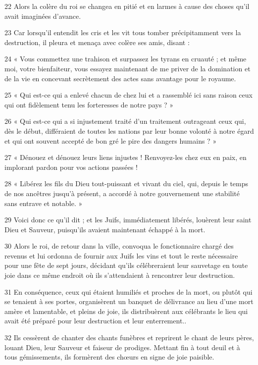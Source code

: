 \par 22 Alors la colère du roi se changea en pitié et en larmes à cause des choses qu'il avait imaginées d'avance.
\par 23 Car lorsqu'il entendit les cris et les vit tous tomber précipitamment vers la destruction, il pleura et menaça avec colère ses amis, disant :
\par 24 « Vous commettez une trahison et surpassez les tyrans en cruauté ; et même moi, votre bienfaiteur, vous essayez maintenant de me priver de la domination et de la vie en concevant secrètement des actes sans avantage pour le royaume.
\par 25 « Qui est-ce qui a enlevé chacun de chez lui et a rassemblé ici sans raison ceux qui ont fidèlement tenu les forteresses de notre pays ? »
\par 26 « Qui est-ce qui a si injustement traité d'un traitement outrageant ceux qui, dès le début, différaient de toutes les nations par leur bonne volonté à notre égard et qui ont souvent accepté de bon gré le pire des dangers humains ? »
\par 27 « Dénouez et dénouez leurs liens injustes ! Renvoyez-les chez eux en paix, en implorant pardon pour vos actions passées !
\par 28 « Libérez les fils du Dieu tout-puissant et vivant du ciel, qui, depuis le temps de nos ancêtres jusqu'à présent, a accordé à notre gouvernement une stabilité sans entrave et notable. »
\par 29 Voici donc ce qu'il dit ; et les Juifs, immédiatement libérés, louèrent leur saint Dieu et Sauveur, puisqu'ils avaient maintenant échappé à la mort.
\par 30 Alors le roi, de retour dans la ville, convoqua le fonctionnaire chargé des revenus et lui ordonna de fournir aux Juifs les vins et tout le reste nécessaire pour une fête de sept jours, décidant qu'ils célébreraient leur sauvetage en toute joie dans ce même endroit où ils s'attendaient à rencontrer leur destruction.
\par 31 En conséquence, ceux qui étaient humiliés et proches de la mort, ou plutôt qui se tenaient à ses portes, organisèrent un banquet de délivrance au lieu d'une mort amère et lamentable, et pleins de joie, ils distribuèrent aux célébrants le lieu qui avait été préparé pour leur destruction et leur enterrement..
\par 32 Ils cessèrent de chanter des chants funèbres et reprirent le chant de leurs pères, louant Dieu, leur Sauveur et faiseur de prodiges. Mettant fin à tout deuil et à tous gémissements, ils formèrent des chœurs en signe de joie paisible.
